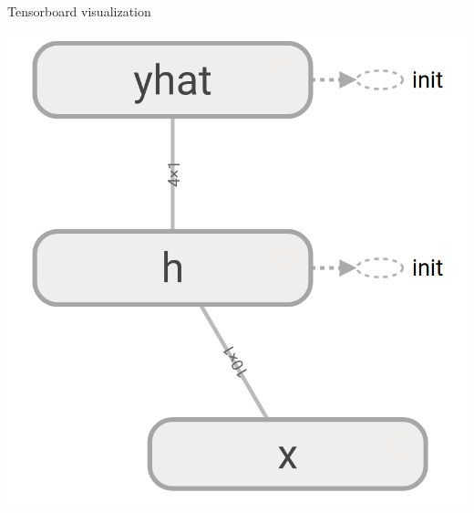 \documentclass[10pt]{beamer}
\begin{document}
\begin{frame}[fragile]{Tensorboard visualization}
\begin{center}
\includegraphics[scale=0.27]{images/abstract_tf_graph1.png}
\end{center}
\end{frame}
\end{document}
